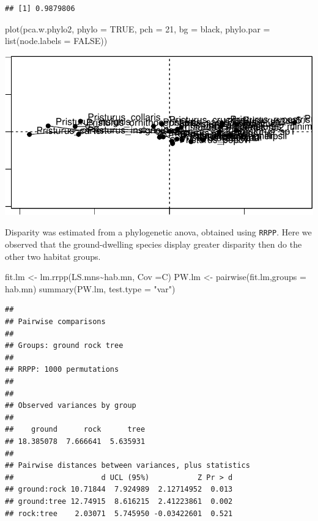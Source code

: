 \documentclass[
  11pt,
]{article}
\newenvironment{Shaded}{\begin{snugshade}}{\end{snugshade}}
\newcommand{\AttributeTok}[1]{\textcolor[rgb]{0.77,0.63,0.00}{#1}}
\newcommand{\ConstantTok}[1]{\textcolor[rgb]{0.00,0.00,0.00}{#1}}
\newcommand{\DecValTok}[1]{\textcolor[rgb]{0.00,0.00,0.81}{#1}}
\newcommand{\FunctionTok}[1]{\textcolor[rgb]{0.00,0.00,0.00}{#1}}
\newcommand{\NormalTok}[1]{#1}
\newcommand{\OtherTok}[1]{\textcolor[rgb]{0.56,0.35,0.01}{#1}}
\newcommand{\SpecialCharTok}[1]{\textcolor[rgb]{0.00,0.00,0.00}{#1}}
\newcommand{\StringTok}[1]{\textcolor[rgb]{0.31,0.60,0.02}{#1}}
\begin{document}
\begin{verbatim}
## [1] 0.9879806
\end{verbatim}

\begin{Shaded}
\begin{Highlighting}[]
\FunctionTok{plot}\NormalTok{(pca.w.phylo2, }\AttributeTok{phylo =} \ConstantTok{TRUE}\NormalTok{, }\AttributeTok{pch =} \DecValTok{21}\NormalTok{, }\AttributeTok{bg =} \StringTok{\textquotesingle{}black\textquotesingle{}}\NormalTok{, }
     \AttributeTok{phylo.par =} \FunctionTok{list}\NormalTok{(}\AttributeTok{node.labels =} \ConstantTok{FALSE}\NormalTok{))}
\end{Highlighting}
\end{Shaded}

\includegraphics{Pristurus-SuppInfo_files/figure-latex/unnamed-chunk-9-1.pdf}

Disparity was estimated from a phylogenetic anova, obtained using
\texttt{RRPP}. Here we observed that the ground-dwelling species display
greater disparity then do the other two habitat groups.

\begin{Shaded}
\begin{Highlighting}[]
\NormalTok{fit.lm }\OtherTok{\textless{}{-}} \FunctionTok{lm.rrpp}\NormalTok{(LS.mns}\SpecialCharTok{\textasciitilde{}}\NormalTok{hab.mn, }\AttributeTok{Cov =}\NormalTok{C)}
\NormalTok{PW.lm }\OtherTok{\textless{}{-}} \FunctionTok{pairwise}\NormalTok{(fit.lm,}\AttributeTok{groups =}\NormalTok{ hab.mn)}
\FunctionTok{summary}\NormalTok{(PW.lm, }\AttributeTok{test.type =} \StringTok{"var"}\NormalTok{)}
\end{Highlighting}
\end{Shaded}

\begin{verbatim}
## 
## Pairwise comparisons
## 
## Groups: ground rock tree 
## 
## RRPP: 1000 permutations
## 
## 
## Observed variances by group
## 
##    ground      rock      tree 
## 18.385078  7.666641  5.635931 
## 
## Pairwise distances between variances, plus statistics
##                    d UCL (95%)           Z Pr > d
## ground:rock 10.71844  7.924989  2.12714952  0.013
## ground:tree 12.74915  8.616215  2.41223861  0.002
## rock:tree    2.03071  5.745950 -0.03422601  0.521
\end{verbatim}
\end{document}
